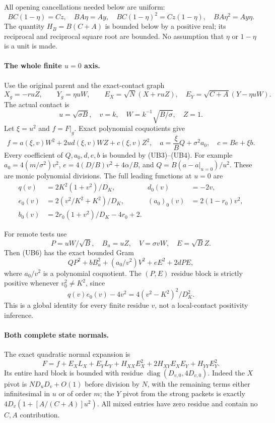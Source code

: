 All opening cancellations needed below are uniform:
\[
 BC(1-\eta)=Cz,\quad BA\eta=Ay,\quad
 BC(1-\eta)^2=Cz(1-\eta),\quad BA\eta^2=Ay\eta.
                                                               \tag{UB4}
\]
The quantity $H_B=B(C+A)$ is bounded below by a positive real;
its reciprocal and reciprocal square root are bounded.  No
assumption that $\eta$ or $1-\eta$ is a unit is made.

\paragraph{The whole finite $u=0$ axis.}
Use the original parent and the exact-contact graph
\[
 X_g=-ruZ,\qquad Y_g=\eta uW,
 \qquad E_X=\sqrt N(X+ruZ),\quad
 E_Y=\sqrt{C+A}(Y-\eta uW).                          \tag{UB5}
\]
The actual contact is
\[
 u=\sqrt{\sigma B},\quad v=k,\quad
 W=k^{-1}\sqrt{B/\sigma},\quad Z=1.
\]
Let $\xi=u^2$ and $f=F|_g$.  Exact polynomial coquotients give
\[
 f=a(\xi,v)W^2+2u d(\xi,v)WZ+c(\xi,v)Z^2,
 \quad a=\frac\xi B Q+\sigma^2a_0,\quad c=B e+\xi b.
                                                               \tag{UB6}
\]
Every coefficient of $Q,a_0,d,e,b$ is bounded by (UB3)--(UB4).
For example $a_0=4(m/\sigma^2)v^2$,
$e=4(D/B)v^2+4\alpha/B$, and
$Q=B(a-a|_{u=0})/u^2$.  These are monic polynomial divisions.
The full leading functions at $u=0$ are
\begin{align*}
 q(v)&=2K^2(1+v^2)/D_K,& d_0(v)&=-2v,\\
 e_0(v)&=2(v^2/K^2+K^2)/D_K,&
 (a_0)_0(v)&=2(1-r_0)v^2,\\
 b_0(v)&=2r_0(1+v^2)/D_K-4r_0+2.                  \tag{UB7}
\end{align*}

For remote tests use
\[
 P=uW/\sqrt B,\quad B_u=uZ,\quad
 V=\sigma vW,\quad E=\sqrt B Z.
\]
Then (UB6) has the exact bounded Gram
\[
 QP^2+b B_u^2+(a_0/v^2)V^2+eE^2+2dPE,             \tag{UB8}
\]
where $a_0/v^2$ is a polynomial coquotient.  The $(P,E)$ residue
block is strictly positive whenever $v_0^2\ne K^2$, since
\[
 q(v)e_0(v)-4v^2=4(v^2-K^2)^2/D_K^2.               \tag{UB9}
\]
This is a global identity for every finite residue $v$, not a
local-contact positivity inference.

\paragraph{Both complete state normals.}
The exact quadratic normal expansion is
\[
 F=f+E_X L_X+E_Y L_Y+H_{XX}E_X^2
                       +2H_{XY}E_XE_Y+H_{YY}E_Y^2.
                                                               \tag{UB10}
\]
Its entire hard block is bounded with residue
$\operatorname{diag}(D_{v,0},4D_{v,0})$.
Indeed the $X$ pivot is $ND_uD_v+O(1)$ before division by $N$,
with the remaining terms either infinitesimal in $u$ or of order
$m$; the $Y$ pivot from the strong packets is exactly
$4D_v(1+[A/(C+A)]u^2)$.  All mixed entries have zero residue and
contain no $C,A$ contribution.

